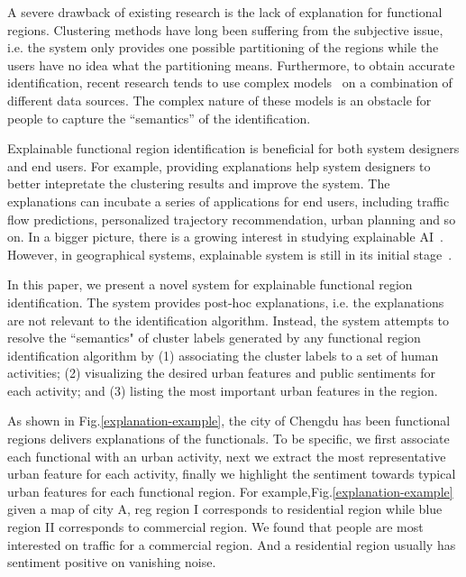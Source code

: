 \documentclass[runningheads]{llncs}
\begin{document}
A severe drawback of existing research is the lack of explanation for functional regions.
Clustering methods have long been suffering from the subjective issue, i.e. the system only provides one possible partitioning of the regions while the users have no idea what the partitioning means. 
Furthermore, to obtain accurate identification, recent research tends to use complex models~\cite{Yuan2015FunctionRegion} on a combination of different data sources. 
The complex nature of these models is an obstacle for people to capture the ``semantics'' of the identification. 

Explainable functional region identification is beneficial for both system designers and end users.
For example, providing explanations help system designers to better intepretate the clustering results and improve the system. 
The explanations can incubate a series of applications for end users, including traffic flow predictions, personalized trajectory recommendation, urban planning and so on. 
In a bigger picture, there is a growing interest in studying explainable AI~\cite{Preece2018ExplainAI}.
However, in geographical systems, explainable system is still in its initial stage~\cite{Korpan2017navigation,Jose2018cognitive}.

In this paper, we present a novel system for explainable functional region identification. The system provides post-hoc explanations, i.e. the explanations are not relevant to the identification algorithm. Instead, the system attempts to resolve the ``semantics" of cluster labels generated by any functional region identification algorithm by (1) associating the cluster labels to a set of human activities; (2) visualizing the desired urban features and public sentiments for each activity; and (3) listing the most important urban features in the region. 

As shown in Fig.\ref{explanation-example}, the city of Chengdu has been functional regions delivers explanations of the  functionals. To be specific, we first associate each functional with an urban activity, next we extract the most representative urban feature for each activity, finally we highlight the sentiment towards typical urban features for each functional region.  For example,Fig.\ref{explanation-example} given a map of city A, reg region I corresponds to residential region while blue region II corresponds to commercial region. We found that people are most interested on traffic for a commercial region. And a residential region usually has sentiment positive on vanishing noise.
\end{document}
